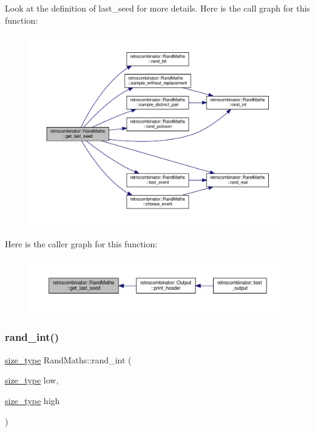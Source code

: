 Look at the definition of last\+\_\+seed for more details. Here is the call graph for this function\+:
\nopagebreak
\begin{figure}[H]
\begin{center}
\leavevmode
\includegraphics[width=350pt]{classretrocombinator_1_1RandMaths_ae3a186a8f3124cbfc698eeae09b708a0_cgraph}
\end{center}
\end{figure}
Here is the caller graph for this function\+:
\nopagebreak
\begin{figure}[H]
\begin{center}
\leavevmode
\includegraphics[width=350pt]{classretrocombinator_1_1RandMaths_ae3a186a8f3124cbfc698eeae09b708a0_icgraph}
\end{center}
\end{figure}
\mbox{\label{classretrocombinator_1_1RandMaths_a8072bad64e64ef042e5257e1bee85635}} 
\subsubsection{\texorpdfstring{rand\+\_\+int()}{rand\_int()}}
{\footnotesize\ttfamily \hyperlink{namespaceretrocombinator_a8e1541b50cee66a791df4c437ccbb385}{size\+\_\+type} Rand\+Maths\+::rand\+\_\+int (\begin{DoxyParamCaption}\item[{\hyperlink{namespaceretrocombinator_a8e1541b50cee66a791df4c437ccbb385}{size\+\_\+type}}]{low,  }\item[{\hyperlink{namespaceretrocombinator_a8e1541b50cee66a791df4c437ccbb385}{size\+\_\+type}}]{high }\end{DoxyParamCaption})}



